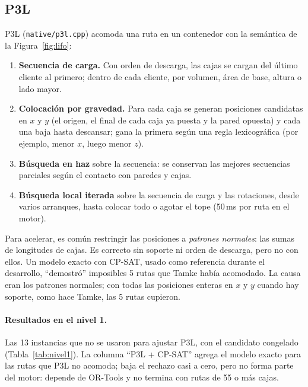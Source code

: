 \documentclass[11pt,a4paper]{article}
\newcommand{\tsl}[1]{\texttt{\small #1}}
\begin{document}
\subsection{P3L}

P3L (\tsl{native/p3l.cpp}) acomoda una ruta en un contenedor con la semántica de la
Figura~\ref{fig:lifo}:

\begin{enumerate}[leftmargin=1.5em]
\item \textbf{Secuencia de carga.} Con orden de descarga, las cajas se cargan del último cliente al
primero; dentro de cada cliente, por volumen, área de base, altura o lado mayor.
\item \textbf{Colocación por gravedad.} Para cada caja se generan posiciones candidatas en $x$ y $y$
(el origen, el final de cada caja ya puesta y la pared opuesta) y cada una baja hasta descansar;
gana la primera según una regla lexicográfica (por ejemplo, menor $x$, luego menor $z$).
\item \textbf{Búsqueda en haz} sobre la secuencia: se conservan las mejores secuencias parciales según
el contacto con paredes y cajas.
\item \textbf{Búsqueda local iterada} sobre la secuencia de carga y las rotaciones, desde varios
arranques, hasta colocar todo o agotar el tope (50\,ms por ruta en el motor).
\end{enumerate}

\begin{leccion}
Para acelerar, es común restringir las posiciones a \emph{patrones normales}: las sumas de longitudes
de cajas. Es correcto sin soporte ni orden de descarga, pero no con ellos. Un modelo exacto con
CP-SAT, usado como referencia durante el desarrollo, ``demostró'' imposibles 5 rutas que Tamke había
acomodado. La causa eran los patrones normales; con todas las posiciones enteras en $x$ y $y$ cuando
hay soporte, como hace Tamke, las 5 rutas cupieron.
\end{leccion}

\paragraph{Resultados en el nivel 1.} Las 13 instancias que no se usaron para ajustar P3L, con el
candidato congelado (Tabla~\ref{tab:nivel1}). La columna ``P3L + CP-SAT'' agrega el modelo exacto para
las rutas que P3L no acomoda; baja el rechazo casi a cero, pero no forma parte del motor: depende de
OR-Tools y no termina con rutas de 55 o más cajas.
\end{document}
